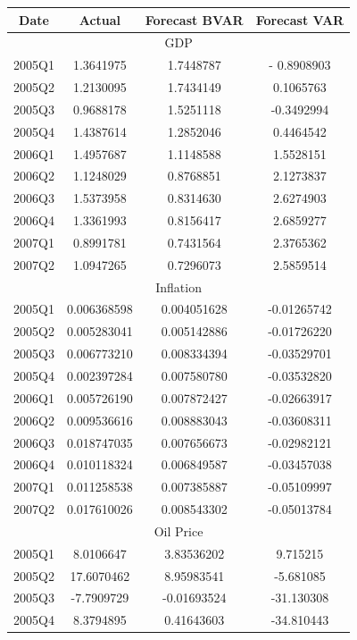 \documentclass[11pt,preprint, authoryear]{elsarticle}
\let\origtable\table
\let\endorigtable\endtable
\renewenvironment{table}[1][2] {
    \expandafter\origtable\expandafter[H]
} {
    \endorigtable
}
\numberwithin{equation}{section}
\numberwithin{figure}{section}
\numberwithin{table}{section}
\begin{document}
\begin{table}
\begin{center}
\begin{tabular}{|c|c|c|c|} 
 \hline
 Date & Actual & Forecast BVAR & Forecast VAR\\ 
 \hline
  \multicolumn{4}{|c|}{GDP} \\
 \hline
2005Q1 & 1.3641975 & 1.7448787 & - 0.8908903 \\
2005Q2 & 1.2130095 & 1.7434149 & 0.1065763 \\
2005Q3 & 0.9688178 & 1.5251118 & -0.3492994 \\
2005Q4 & 1.4387614 & 1.2852046 & 0.4464542 \\
2006Q1 & 1.4957687 & 1.1148588 & 1.5528151 \\
2006Q2 & 1.1248029 & 0.8768851 & 2.1273837 \\
2006Q3 & 1.5373958 & 0.8314630 & 2.6274903 \\
2006Q4 & 1.3361993 & 0.8156417 & 2.6859277 \\
2007Q1 & 0.8991781 & 0.7431564 & 2.3765362 \\
2007Q2 & 1.0947265 & 0.7296073 & 2.5859514 \\
 \hline
\multicolumn{4}{|c|}{Inflation} \\
\hline
2005Q1 & 0.006368598 & 0.004051628 & -0.01265742 \\
2005Q2 & 0.005283041 & 0.005142886 & -0.01726220 \\
2005Q3 & 0.006773210 & 0.008334394 & -0.03529701 \\
2005Q4 & 0.002397284 & 0.007580780 & -0.03532820 \\
2006Q1 & 0.005726190 & 0.007872427 & -0.02663917 \\
2006Q2 & 0.009536616 & 0.008883043 & -0.03608311 \\
2006Q3 & 0.018747035 & 0.007656673 & -0.02982121\\
2006Q4 & 0.010118324 & 0.006849587 & -0.03457038 \\
2007Q1 & 0.011258538 & 0.007385887 & -0.05109997 \\
2007Q2 & 0.017610026 & 0.008543302 & -0.05013784 \\
\hline
\multicolumn{4}{|c|}{Oil Price} \\
\hline
2005Q1 & 8.0106647 & 3.83536202 & 9.715215 \\
2005Q2 & 17.6070462 & 8.95983541 & -5.681085\\
2005Q3 & -7.7909729 & -0.01693524 & -31.130308 \\
2005Q4 & 8.3794895 & 0.41643603 & -34.810443 \\

\end{tabular}
\end{center}
\end{table}
\end{document}
